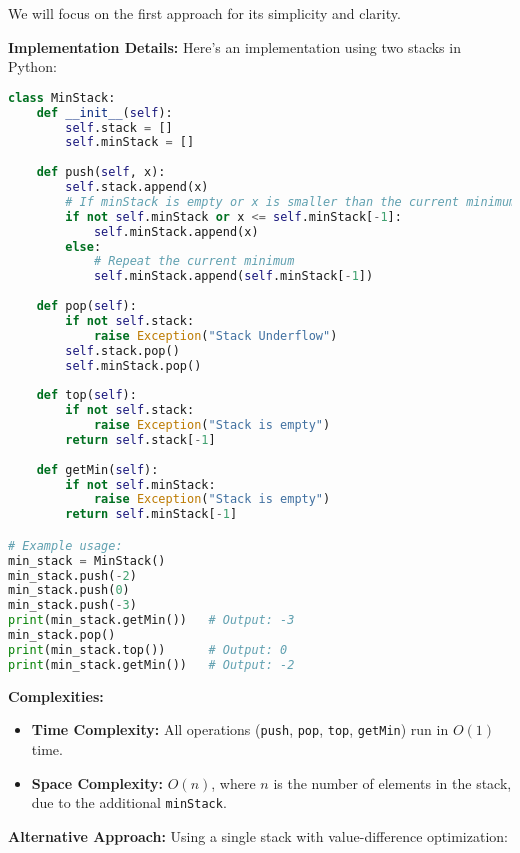 We will focus on the first approach for its simplicity and clarity.

\textbf{Implementation Details:}  
Here's an implementation using two stacks in Python:

\begin{fullwidth}
\begin{lstlisting}[language=Python]
class MinStack:
    def __init__(self):
        self.stack = []
        self.minStack = []
    
    def push(self, x):
        self.stack.append(x)
        # If minStack is empty or x is smaller than the current minimum
        if not self.minStack or x <= self.minStack[-1]:
            self.minStack.append(x)
        else:
            # Repeat the current minimum
            self.minStack.append(self.minStack[-1])
    
    def pop(self):
        if not self.stack:
            raise Exception("Stack Underflow")
        self.stack.pop()
        self.minStack.pop()
    
    def top(self):
        if not self.stack:
            raise Exception("Stack is empty")
        return self.stack[-1]
    
    def getMin(self):
        if not self.minStack:
            raise Exception("Stack is empty")
        return self.minStack[-1]

# Example usage:
min_stack = MinStack()
min_stack.push(-2)
min_stack.push(0)
min_stack.push(-3)
print(min_stack.getMin())   # Output: -3
min_stack.pop()
print(min_stack.top())      # Output: 0
print(min_stack.getMin())   # Output: -2
\end{lstlisting}
\end{fullwidth}

\textbf{Complexities:}

\begin{itemize}
    \item \textbf{Time Complexity:} All operations (\texttt{push}, \texttt{pop}, \texttt{top}, \texttt{getMin}) run in \(O(1)\) time.
    \item \textbf{Space Complexity:} \(O(n)\), where \(n\) is the number of elements in the stack, due to the additional \texttt{minStack}.
\end{itemize}

\textbf{Alternative Approach:}  
Using a single stack with value-difference optimization:


